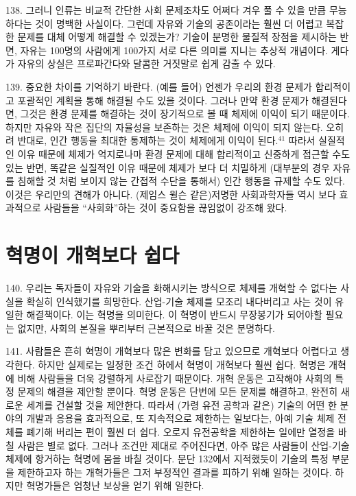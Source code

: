 \documentclass[11pt,a4paper]{article}
\begin{document}
\begin{multicols}{2}
138. 그러니 인류는 비교적 간단한 사회 문제조차도 어쩌다 겨우 풀 수 있을 만큼 무능하다는 것이  명백한 사실이다. 그런데 자유와 기술의 공존이라는 훨씬 더 어렵고 복잡한 문제를 대체 어떻게 해결할 수 있겠는가? 기술이 분명한 물질적 장점을 제시하는 반면, 자유는 100명의 사람에게 100가지 서로 다른  의미를 지니는 추상적 개념이다. 게다가 자유의 상실은 프로파간다와 달콤한 거짓말로 쉽게 감출 수 있다. 


139. 중요한 차이를 기억하기 바란다. (예를 들어) 언젠가 우리의 환경 문제가 합리적이고 포괄적인  계획을 통해 해결될 수도 있을 것이다. 그러나 만약 환경 문제가 해결된다면, 그것은 환경 문제를  해결하는 것이 장기적으로 볼 때 체제에 이익이 되기 때문이다. 하지만 자유와 작은 집단의 자율성을  보존하는 것은 체제에 이익이 되지 않는다. 오히려 반대로, 인간 행동을 최대한 통제하는 것이 체제에게  이익이 된다.\hyperlink{41}{$^{41}$} 따라서 실질적인 이유 때문에 체제가 억지로나마 환경 문제에 대해 합리적이고 신중하게  접근할 수도 있는 반면, 똑같은 실질적인 이유 때문에 체제가 보다 더 치밀하게 (대부분의 경우 자유를  침해할 것 처럼 보이지 않는 간접적 수단을 통해서) 인간 행동을 규제할 수도 있다. 이것은 우리만의  견해가 아니다. (제임스 윌슨 같은)저명한 사회과학자들 역시 보다 효과적으로 사람들을 “사회화”하는  것이 중요함을 끊임없이 강조해 왔다. 


\section*{혁명이 개혁보다 쉽다}

140. 우리는 독자들이 자유와 기술을 화해시키는 방식으로 체제를 개혁할 수 없다는 사실을 확실히  인식했기를 희망한다. 산업-기술 체제를 모조리 내다버리고 사는 것이 유일한 해결책이다. 이는 혁명을  의미한다. 이 혁명이 반드시 무장봉기가 되어야할 필요는 없지만, 사회의 본질을 뿌리부터 근본적으로  바꿀 것은 분명하다.  


141. 사람들은 흔히 혁명이 개혁보다 많은 변화를 담고 있으므로 개혁보다 어렵다고 생각한다. 하지만  실제로는 일정한 조건 하에서 혁명이 개혁보다 훨씬 쉽다. 혁명은 개혁에 비해 사람들을 더욱 강렬하게  사로잡기 때문이다. 개혁 운동은 고작해야 사회의 특정 문제의 해결을 제안할 뿐이다. 혁명 운동은 단번에 모든 문제를 해결하고, 완전히 새로운 세계를 건설할 것을 제안한다. 따라서 (가령 유전 공학과 같은) 기술의 어떤 한 분야의 개발과 응용을 효과적으로, 또 지속적으로 제한하는 일보다는, 아예 기술 체제  전체를 폐기해 버리는 편이 훨씬 더 쉽다. 오로지 유전공학을 제한하는 일에만 열정을 바칠 사람은 별로  없다. 그러나 조건만 제대로 주어진다면, 아주 많은 사람들이 산업-기술 체제에 항거하는 혁명에 몸을  바칠 것이다. 문단 132에서 지적했듯이 기술의 특정 부문을 제한하고자 하는 개혁가들은 그저 부정적인  결과를 피하기 위해 일하는 것이다. 하지만 혁명가들은 엄청난 보상을 얻기 위해 일한다.  



\end{multicols}
\end{document}
